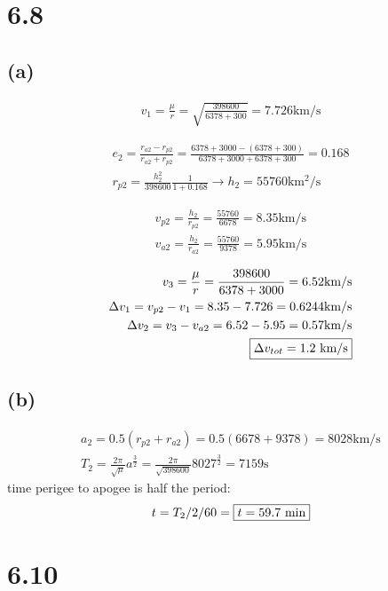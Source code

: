 \documentclass[12 pt]{article}
\begin{document}
\pagebreak
\section*{6.8}

\subsection*{(a)}
\begin{align*}
    v_1=\frac{\mu}{r}=\sqrt{\frac{398600}{6378+300}}=7.726\text{km/s}
\end{align*}

\begin{align*}
    e_2=\frac{r_{a2}-r_{p2}}{r_{a2}+r_{p2}}=\frac{6378+3000-(6378+300)}{6378+3000+6378+300}=0.168 \\
    r_{p2}=\frac{h_2^2}{398600}\frac{1}{1+0.168}\rightarrow h_2=55760\text{km$^2$/s}
\end{align*}

\begin{align*}
    v_{p2}=\frac{h_2}{r_{p2}}=\frac{55760}{6678}=8.35\text{km/s} \\
    v_{a2}=\frac{h_2}{r_{a2}}=\frac{55760}{9378}=5.95\text{km/s}
\end{align*}

\begin{align*}
    v_3=\frac{\mu}{r}=\frac{398600}{6378+3000}=6.52\text{km/s} \\
    \Delta v_1=v_{p2}-v_1=8.35-7.726=0.6244\text{km/s} \\
    \Delta v_2=v_3-v_{a2}=6.52-5.95=0.57\text{km/s} \\
    \fbox{$\Delta v_{tot}=1.2$ km/s}
\end{align*}

\subsection*{(b)}
\begin{align*}
    a_2=0.5(r_{p2}+r_{a2})=0.5(6678+9378)=8028\text{km/s} \\
    T_2=\frac{2\pi}{\sqrt{\mu}}a^{\frac{3}{2}}=\frac{2\pi}{\sqrt{398600}}8027^{\frac{3}{2}}=7159\text{s}
\end{align*}
time perigee to apogee is half the period:
\begin{align*}
    t=T_2/2/60=\fbox{$t=59.7$ min}
\end{align*}

\pagebreak
\section*{6.10}
\end{document}
